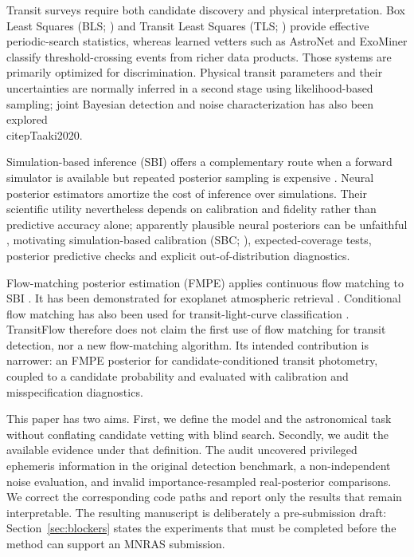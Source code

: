 \documentclass[fleqn,usenatbib]{mnras}
\begin{document}
Transit surveys require both candidate discovery and physical interpretation.
Box Least Squares (BLS; \citealt{Kovacs2002}) and Transit Least Squares
(TLS; \citealt{Hippke2019}) provide effective periodic-search statistics,
whereas learned vetters such as AstroNet \citep{Shallue2018} and ExoMiner
\citep{Valizadegan2022} classify threshold-crossing events from richer data
products. Those systems are primarily optimized for discrimination. Physical
transit parameters and their uncertainties are normally inferred in a second
stage using likelihood-based sampling; joint Bayesian detection and noise
characterization has also been explored \\citep{Taaki2020}.

Simulation-based inference (SBI) offers a complementary route when a forward
simulator is available but repeated posterior sampling is expensive
\citep{Cranmer2020,Lueckmann2021}. Neural posterior estimators amortize the cost
of inference over simulations. Their scientific utility nevertheless depends on
calibration and fidelity rather than predictive accuracy alone; apparently
plausible neural posteriors can be unfaithful \citep{Hermans2022}, motivating
simulation-based calibration (SBC; \citealt{Talts2018}), expected-coverage
tests, posterior predictive checks and explicit out-of-distribution diagnostics.

Flow-matching posterior estimation (FMPE) applies continuous flow matching
\citep{Lipman2023} to SBI \citep{Dax2023}. It has been demonstrated for
exoplanet atmospheric retrieval \citep{Gebhard2025}. Conditional flow matching
has also been used for transit-light-curve classification \citep{Fiscale2025}.
TransitFlow therefore does not claim the first use of flow matching for transit
detection, nor a new flow-matching algorithm. Its intended contribution is
narrower: an FMPE posterior for candidate-conditioned transit photometry,
coupled to a candidate probability and evaluated with calibration and
misspecification diagnostics.

This paper has two aims. First, we define the model and the astronomical task
without conflating candidate vetting with blind search. Secondly, we audit the
available evidence under that definition. The audit uncovered privileged
ephemeris information in the original detection benchmark, a non-independent
noise evaluation, and invalid importance-resampled real-posterior comparisons.
We correct the corresponding code paths and report only the results that remain
interpretable. The resulting manuscript is deliberately a pre-submission draft:
Section~\ref{sec:blockers} states the experiments that must be completed before
the method can support an MNRAS submission.
\end{document}
